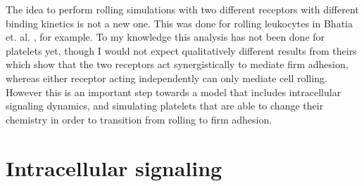 The idea to perform rolling simulations with two different receptors
with different binding kinetics is not a new one. This was done for
rolling leukocytes in Bhatia et. al. \cite{Bhatia2003}, for
example. To my knowledge this analysis has not been done for platelets
yet, though I would not expect qualitatively different results from
theirs which show that the two receptors act synergistically to
mediate firm adhesion, whereas either receptor acting independently
can only mediate cell rolling. However this is an important step
towards a model that includes intracellular signaling dynamics, and
simulating platelets that are able to change their chemistry in order
to transition from rolling to firm adhesion. 

\section{Intracellular signaling}
\label{sec:intr-sign}



